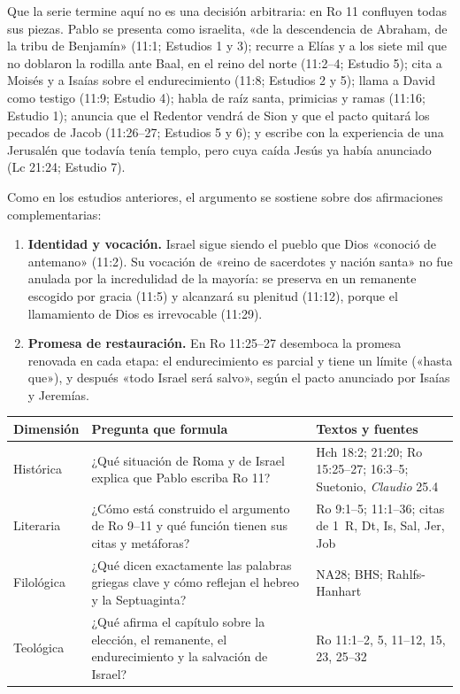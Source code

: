 \documentclass[11pt,letterpaper]{article}
\begin{document}
Que la serie termine aquí no es una decisión arbitraria: en Ro 11 confluyen todas sus piezas. Pablo se presenta como israelita, «de la descendencia de Abraham, de la tribu de Benjamín» (11:1; Estudios 1 y 3); recurre a Elías y a los siete mil que no doblaron la rodilla ante Baal, en el reino del norte (11:2--4; Estudio 5); cita a Moisés y a Isaías sobre el endurecimiento (11:8; Estudios 2 y 5); llama a David como testigo (11:9; Estudio 4); habla de raíz santa, primicias y ramas (11:16; Estudio 1); anuncia que el Redentor vendrá de Sion y que el pacto quitará los pecados de Jacob (11:26--27; Estudios 5 y 6); y escribe con la experiencia de una Jerusalén que todavía tenía templo, pero cuya caída Jesús ya había anunciado (Lc 21:24; Estudio 7).

Como en los estudios anteriores, el argumento se sostiene sobre dos afirmaciones complementarias:
\begin{enumerate}
\item \textbf{Identidad y vocación.} Israel sigue siendo el pueblo que Dios «conoció de antemano» (11:2). Su vocación de «reino de sacerdotes y nación santa» no fue anulada por la incredulidad de la mayoría: se preserva en un remanente escogido por gracia (11:5) y alcanzará su plenitud (11:12), porque el llamamiento de Dios es irrevocable (11:29).
\item \textbf{Promesa de restauración.} En Ro 11:25--27 desemboca la promesa renovada en cada etapa: el endurecimiento es parcial y tiene un límite («hasta que»), y después «todo Israel será salvo», según el pacto anunciado por Isaías y Jeremías.
\end{enumerate}

\begin{center}\small
\renewcommand{\arraystretch}{1.3}
\begin{tabular}{>{\RaggedRight\arraybackslash}p{2.4cm}>{\RaggedRight\arraybackslash}p{6.4cm}>{\RaggedRight\arraybackslash}p{5.2cm}}
\toprule
\textbf{Dimensión} & \textbf{Pregunta que formula} & \textbf{Textos y fuentes}\\
\midrule
Histórica & ¿Qué situación de Roma y de Israel explica que Pablo escriba Ro 11? & Hch 18:2; 21:20; Ro 15:25--27; 16:3--5; Suetonio, \emph{Claudio} 25.4\\
Literaria & ¿Cómo está construido el argumento de Ro 9--11 y qué función tienen sus citas y metáforas? & Ro 9:1--5; 11:1--36; citas de 1~R, Dt, Is, Sal, Jer, Job\\
Filológica & ¿Qué dicen exactamente las palabras griegas clave y cómo reflejan el hebreo y la Septuaginta? & NA28; BHS; Rahlfs-Hanhart\\
Teológica & ¿Qué afirma el capítulo sobre la elección, el remanente, el endurecimiento y la salvación de Israel? & Ro 11:1--2, 5, 11--12, 15, 23, 25--32\\
\bottomrule
\end{tabular}\end{center}
\end{document}
